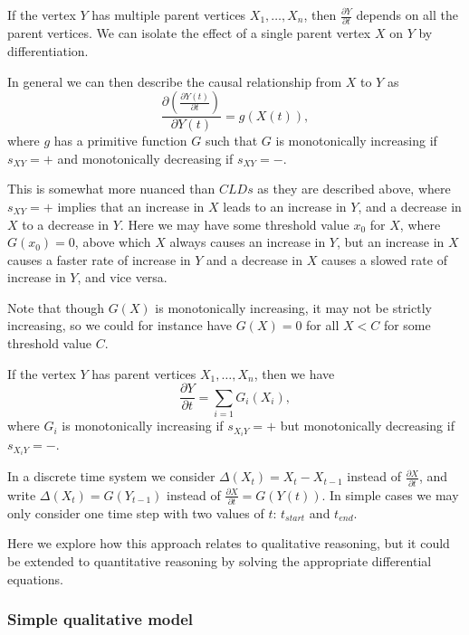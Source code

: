 If the vertex $Y$ has multiple parent vertices $X_1,\ldots,X_n$, then
$\frac{\partial Y}{\partial t}$ depends on all the parent vertices.
%
We can isolate the effect of a single parent vertex $X$ on $Y$ by
differentiation.

In general we can then describe the causal relationship from $X$ to
$Y$ as
%
\[\frac{\partial\left( \frac{\partial Y(t)}{\partial t} \right)}{\partial Y(t)} =
  g(X(t)),\]
%
where $g$ has a primitive function $G$ such that $G$ is monotonically
increasing if $s_{XY}=+$ and monotonically decreasing if $s_{XY}= -$.

This is somewhat more nuanced than $CLDs$ as they are described above,
where $s_{XY}=+$ implies that an increase in $X$ leads to an increase
in $Y$, and a decrease in $X$ to a decrease in $Y$.
%
Here we may have some threshold value $x_0$ for $X$, where
$G(x_0) = 0$, above which $X$ always causes an increase in $Y$, but an
increase in $X$ causes a faster rate of increase in $Y$ and a decrease
in $X$ causes a slowed rate of increase in $Y$, and vice versa.

Note that though $G(X)$ is monotonically increasing, it may not be
strictly increasing, so we could for instance have $G(X) = 0$ for all
$X < C$ for some threshold value $C$.

If the vertex $Y$ has parent vertices $X_1,\ldots,X_n$, then we have
\[\frac{\partial Y}{\partial t} = \sum_{i=1}G_i(X_i),\]
where $G_i$ is monotonically increasing if $s_{X_iY}=+$ but monotonically
decreasing if $s_{X_iY}=-$.

In a discrete time system we consider $\Delta(X_t) = X_t - X_{t-1}$
instead of $\frac{\partial X}{\partial t}$, and write
$\Delta(X_t) = G(Y_{t-1})$ instead of
$\frac{\partial X}{\partial t} = G(Y(t))$.
%
In simple cases we may only consider one time step with two values of
$t$: $t_{start}$ and $t_{end}$.

Here we explore how this approach relates to qualitative reasoning,
but it could be extended to quantitative reasoning by solving the
appropriate differential equations.

\subsubsection{Simple qualitative model}

